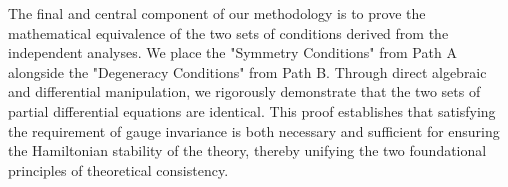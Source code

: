 \documentclass[twocolumn]{aastex631}
\begin{document}
The final and central component of our methodology is to prove the mathematical equivalence of the two sets of conditions derived from the independent analyses. We place the "Symmetry Conditions" from Path A alongside the "Degeneracy Conditions" from Path B. Through direct algebraic and differential manipulation, we rigorously demonstrate that the two sets of partial differential equations are identical. This proof establishes that satisfying the requirement of gauge invariance is both necessary and sufficient for ensuring the Hamiltonian stability of the theory, thereby unifying the two foundational principles of theoretical consistency.
\end{document}
